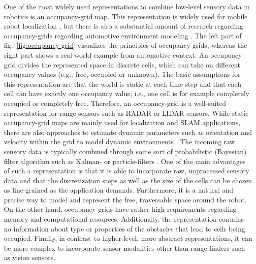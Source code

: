 One of the most widely used representations to combine low-level sensory data in robotics is an occupancy-grid map.
This representation is widely used for mobile robot localization \cite{Thrun2005}, but there is also a substantial amount of research regarding occupancy-grids regarding automotive environment modeling  \cite{Tanzmeister2014, Steyer2018}.
The left part of fig.~\ref{fig:occupancy-grid} visualizes the principles of occupancy-grids, whereas the right part shows a real world example from automotive context.
An occupancy-grid divides the represented space in discrete cells, which can take on different occupancy values (e.g., free, occupied or unknown).
The basic assumptions for this representation are that the world is static at each time step and that each cell can have exactly one occupancy value, i.e., one cell is for example completely occupied or completely free.
Therefore, an occupancy-grid is a well-suited representation for range sensors such as \ac{RADAR} or \ac{LIDAR} sensors.
While static occupancy-grid maps are mainly used for localization and \ac{SLAM} applications, there are also approaches to estimate dynamic parameters such as orientation and velocity within the grid to model dynamic environments \cite{Tanzmeister2014}.
The incoming raw sensory data is typically combined through some sort of probabilistic (Bayesian) filter algorithm such as Kalman- \cite{Kalman1960} or particle-filters \cite{Gordon1993}.
One of the main advantages of such a representation is that it is able to incorporate raw, unprocessed sensory data and that the discretization steps as well as the size of the cells can be chosen as fine-grained as the application demands.
Furthermore, it is a natural and precise way to model and represent the free, traversable space around the robot.
On the other hand, occupancy-grids have rather high requirements regarding memory and computational resources.
Additionally, the representation contains no information about type or properties of the obstacles that lead to cells being occupied.
Finally, in contrast to higher-level, more abstract representations, it can be more complex to incorporate sensor modalities other than range finders such as vision sensors.

